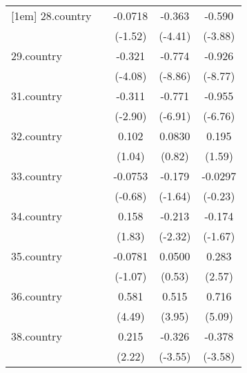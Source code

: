 {\begin{tabular}{l*{4}{c}}
[1em]
28.country  &                     &     -0.0718         &      -0.363\sym{***}&      -0.590\sym{***}\\
            &                     &     (-1.52)         &     (-4.41)         &     (-3.88)         \\
[1em]
29.country  &                     &      -0.321\sym{***}&      -0.774\sym{***}&      -0.926\sym{***}\\
            &                     &     (-4.08)         &     (-8.86)         &     (-8.77)         \\
[1em]
31.country  &                     &      -0.311\sym{**} &      -0.771\sym{***}&      -0.955\sym{***}\\
            &                     &     (-2.90)         &     (-6.91)         &     (-6.76)         \\
[1em]
32.country  &                     &       0.102         &      0.0830         &       0.195         \\
            &                     &      (1.04)         &      (0.82)         &      (1.59)         \\
[1em]
33.country  &                     &     -0.0753         &      -0.179         &     -0.0297         \\
            &                     &     (-0.68)         &     (-1.64)         &     (-0.23)         \\
[1em]
34.country  &                     &       0.158         &      -0.213\sym{*}  &      -0.174         \\
            &                     &      (1.83)         &     (-2.32)         &     (-1.67)         \\
[1em]
35.country  &                     &     -0.0781         &      0.0500         &       0.283\sym{*}  \\
            &                     &     (-1.07)         &      (0.53)         &      (2.57)         \\
[1em]
36.country  &                     &       0.581\sym{***}&       0.515\sym{***}&       0.716\sym{***}\\
            &                     &      (4.49)         &      (3.95)         &      (5.09)         \\
[1em]
38.country  &                     &       0.215\sym{*}  &      -0.326\sym{***}&      -0.378\sym{***}\\
            &                     &      (2.22)         &     (-3.55)         &     (-3.58)         \\

\end{tabular}}
